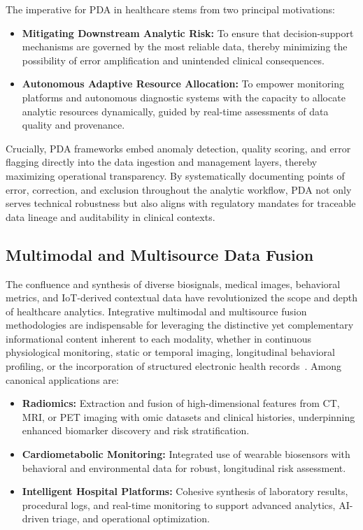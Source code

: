 The imperative for PDA in healthcare stems from two principal motivations:
\begin{itemize}
    \item \textbf{Mitigating Downstream Analytic Risk:} To ensure that decision-support mechanisms are governed by the most reliable data, thereby minimizing the possibility of error amplification and unintended clinical consequences.
    \item \textbf{Autonomous Adaptive Resource Allocation:} To empower monitoring platforms and autonomous diagnostic systems with the capacity to allocate analytic resources dynamically, guided by real-time assessments of data quality and provenance.
\end{itemize}
Crucially, PDA frameworks embed anomaly detection, quality scoring, and error flagging directly into the data ingestion and management layers, thereby maximizing operational transparency. By systematically documenting points of error, correction, and exclusion throughout the analytic workflow, PDA not only serves technical robustness but also aligns with regulatory mandates for traceable data lineage and auditability in clinical contexts.

\subsection{Multimodal and Multisource Data Fusion}

The confluence and synthesis of diverse biosignals, medical images, behavioral metrics, and IoT-derived contextual data have revolutionized the scope and depth of healthcare analytics. Integrative multimodal and multisource fusion methodologies are indispensable for leveraging the distinctive yet complementary informational content inherent to each modality, whether in continuous physiological monitoring, static or temporal imaging, longitudinal behavioral profiling, or the incorporation of structured electronic health records~\cite{ref41,ref42,ref46,ref50,ref53,ref54,ref60,ref61,ref62,ref64,ref65,ref70,ref71,ref84,ref86,ref89,ref90,ref106,ref107}. Among canonical applications are:
\begin{itemize}
    \item \textbf{Radiomics:} Extraction and fusion of high-dimensional features from CT, MRI, or PET imaging with omic datasets and clinical histories, underpinning enhanced biomarker discovery and risk stratification.
    \item \textbf{Cardiometabolic Monitoring:} Integrated use of wearable biosensors with behavioral and environmental data for robust, longitudinal risk assessment.
    \item \textbf{Intelligent Hospital Platforms:} Cohesive synthesis of laboratory results, procedural logs, and real-time monitoring to support advanced analytics, AI-driven triage, and operational optimization.
\end{itemize}

